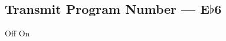 \subsection[Transmit Program Number]{Transmit Program Number --- \UiKey{\SET}E$\flat$6}









































Off
On

